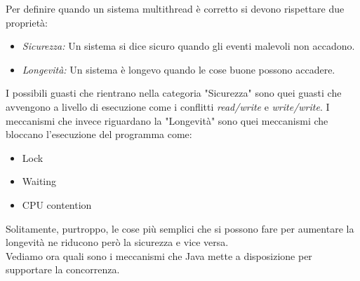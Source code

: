 Per definire quando un sistema multithread è corretto si devono rispettare due proprietà:
\begin{itemize}
\item\emph{Sicurezza:} Un sistema si dice sicuro quando gli eventi malevoli non accadono.
\item\emph{Longevità:} Un sistema è longevo quando le cose buone possono accadere.
\end{itemize}
I possibili guasti che rientrano nella categoria "Sicurezza" sono quei guasti che avvengono a livello di esecuzione come i conflitti \emph{read/write} e \emph{write/write}. I meccanismi che invece riguardano la "Longevità" sono quei meccanismi che bloccano l'esecuzione del programma come:
\begin{itemize}
\item Lock
\item Waiting
\item CPU contention
\end{itemize}
Solitamente, purtroppo, le cose più semplici che si possono fare per aumentare la longevità ne riducono però la sicurezza e vice versa.\\
Vediamo ora quali sono i meccanismi che Java mette a disposizione per supportare la concorrenza.
